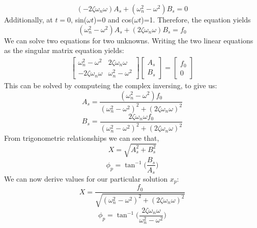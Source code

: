 \documentclass[12pt,letter]{article}
\numberwithin{ex}{section} %
\numberwithin{re}{section} %
\begin{document}
			\begin{equation}
				(-2\zeta \omega_n \omega)A_s + (\omega_n^2 - \omega^2)B_s = 0
			\end{equation}	
			Additionally, at $t=0$, sin($\omega t$)=0 and cos($\omega t$)=1. Therefore, the equation yields		
			\begin{equation}
				(\omega_n^2 - \omega^2)A_s + (2\zeta \omega_n \omega)B_s = f_0
			\end{equation}				
			We can solve two equations for two unknowns. Writing the two linear equations as the singular matrix equation yields:
			\begin{gather}
			   \begin{bmatrix}
			   \omega_n^2 - \omega^2 & 2\zeta \omega_n \omega \\
			   - 2\zeta \omega_n \omega &  \omega_n^2 - \omega^2
			   \end{bmatrix}
  			   \begin{bmatrix}
  			   A_s \\
  			   B_s
  			   \end{bmatrix}
			 = \begin{bmatrix} f_0 \\ 0
			 \end{bmatrix}
			\end{gather}
			This can be solved by computeing the complex inversing, to give us:
			\begin{equation}
				A_s = \frac{(\omega_n^2 - \omega^2)f_0}{(\omega_n^2 - \omega^2)^2 +  (2\zeta \omega_n \omega)^2}
			\end{equation}	
			\begin{equation}
				B_s = \frac{2\zeta \omega_n \omega f_0}{(\omega_n^2 - \omega^2)^2 +  (2\zeta \omega_n \omega)^2}
			\end{equation}	
			From trigonometric relationships we can see that, 
			\begin{equation}
				X = \sqrt{A_s^2 + B_s^2}
			\end{equation}	
			\begin{equation}
				\phi_p = \tan^{-1}\bigg(\frac{B_s}{A_s}\bigg)
			\end{equation}	
			We can now derive values for our particular solution $x_p$:
			\begin{equation}
				X = \frac{f_0}{\sqrt{(\omega_n^2 - \omega^2)^2 +  (2\zeta \omega_n \omega)^2}} 
				\label{eq:X_damped}
			\end{equation}	
			\begin{equation}
				\phi_p = \tan^{-1} \bigg(\frac{2\zeta \omega_n \omega}{\omega_n^2 - \omega^2}\bigg)
			\end{equation}				
\end{document}
